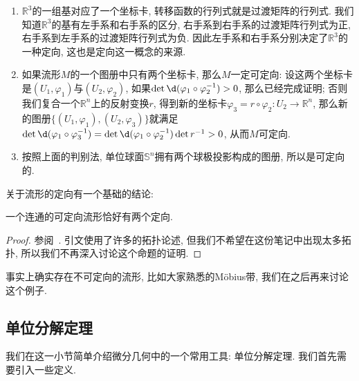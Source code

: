 \begin{eg}
    \begin{enumerate}[(1)]
        \item $\mathbb{R}^3$的一组基对应了一个坐标卡, 转移函数的行列式就是过渡矩阵的行列式.
        我们知道$\mathbb{R}^3$的基有左手系和右手系的区分, 右手系到右手系的过渡矩阵行列式为正, 右手系到左手系的过渡矩阵行列式为负.
        因此左手系和右手系分别决定了$\mathbb{R}^3$的一种定向, 这也是定向这一概念的来源.
        \item 如果流形$M$的一个图册中只有两个坐标卡, 那么$M$一定可定向:
        设这两个坐标卡是$(U_1,\varphi_1)$与$(U_2,\varphi_2)$, 如果$\det\d(\varphi_1\circ\varphi_2^{-1})>0$, 那么已经完成证明;
        否则我们复合一个$\mathbb{R}^n$上的反射变换$r$, 得到新的坐标卡$\varphi_3=r\circ\varphi_2:U_2\to\mathbb{R}^n$, 那么新的图册$\{(U_1,\varphi_1),(U_2,\varphi_3)\}$就满足$\det\d(\varphi_1\circ\varphi_3^{-1})=\det\d(\varphi_1\circ\varphi_2^{-1})\det{r^{-1}}>0$, 从而$M$可定向.
        \item 按照上面的判别法, 单位球面$\mathbb{S}^n$拥有两个球极投影构成的图册, 所以是可定向的.
    \end{enumerate}
\end{eg}

关于流形的定向有一个基础的结论:

\begin{prop}\label{2 orientations}
    一个连通的可定向流形恰好有两个定向.
\end{prop}

\begin{proof}
    参阅~\parencite[引理1.1.2]{Mei_Manifold}. 
    引文使用了许多的拓扑论述, 但我们不希望在这份笔记中出现太多拓扑, 所以我们不再深入讨论这个命题的证明.
\end{proof}

事实上确实存在不可定向的流形, 比如大家熟悉的M\"{o}bius带, 我们在之后再来讨论这个例子.\label{sect_of_mani}

\subsection*{单位分解定理}

我们在这一小节简单介绍微分几何中的一个常用工具: 单位分解定理.
我们首先需要引入一些定义.

